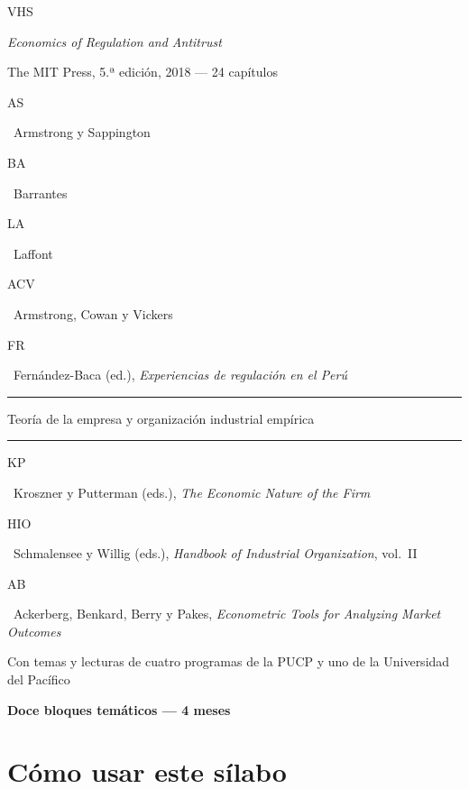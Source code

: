 \documentclass[11pt,a4paper]{article}
\newcommand{\etiqueta}[2]{%
  {\setlength{\fboxsep}{1.4pt}\colorbox{#1}{\sffamily\bfseries\color{white}\strut#2}}}
\begin{document}
\begin{titlepage}
\vspace{0.3cm}
{\large\etiqueta{colorVHS}{VHS} \par}
{\normalsize \emph{\color{colorVHS}Economics of Regulation and Antitrust}\par}
{\small\color{tonoPizarra} The MIT Press, 5.ª edición, 2018 --- 24 capítulos\par}
\vspace{0.2cm}
{\small\etiqueta{colorAS}{AS}~Armstrong y Sappington
\quad \etiqueta{colorBA}{BA}~Barrantes
\quad \etiqueta{colorLA}{LA}~Laffont
\quad \etiqueta{colorACV}{ACV}~Armstrong, Cowan y Vickers\par}
{\small\etiqueta{colorFR}{FR}~Fernández-Baca (ed.), \emph{Experiencias de regulación en el Perú}\par}
\vspace{0.6cm}
{\sffamily\large\bfseries\color{tonoPrincipal}\textcolor{tonoClaro}{\rule[0.5ex]{1.5cm}{0.6pt}}\quad Teoría de la empresa y organización industrial empírica\quad\textcolor{tonoClaro}{\rule[0.5ex]{1.5cm}{0.6pt}}\par}
\vspace{0.3cm}
{\small\etiqueta{colorKP}{KP}~Kroszner y Putterman (eds.), \emph{The Economic Nature of the Firm}\par}
{\small\etiqueta{colorHIO}{HIO}~Schmalensee y Willig (eds.), \emph{Handbook of Industrial Organization}, vol.~II\par}
{\small\etiqueta{colorAB}{AB}~Ackerberg, Benkard, Berry y Pakes, \emph{Econometric Tools for Analyzing Market Outcomes}\par}
\vspace{0.5cm}
{\normalsize\color{colorPUCP} Con temas y lecturas de cuatro programas de la PUCP y uno de la Universidad del Pacífico\par}
\vfill
{\setlength{\fboxsep}{6pt}\colorbox{tonoPrincipal}{\normalsize\sffamily\bfseries\color{white} Doce bloques temáticos --- 4 meses}\par}
\vspace{0.2cm}
\end{titlepage}

\tableofcontents
\newpage

\section*{Cómo usar este sílabo}
\end{document}
